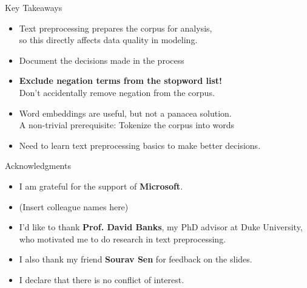\documentclass{beamer}
\renewcommand{\cite}{\citep}
\begin{document}




\begin{frame}{Key Takeaways}
\begin{itemize}
\item Text preprocessing prepares the corpus for analysis,\\
	so this directly affects data quality in modeling.
\item Document the decisions made in the process~\cite{nugent2020instead}
	\bigskip
\item \textbf{Exclude negation terms from the stopword list!}\\
	Don't accidentally remove negation from the corpus.
	\bigskip
\item Word embeddings are useful, but not a panacea solution.\\
	A non-trivial prerequisite: Tokenize the corpus into words\\
\item Need to learn text preprocessing basics to make better decisions.
\end{itemize}
\end{frame}

\begin{frame}{Acknowledgments}
\begin{itemize}
\item I am grateful for the support of \textbf{Microsoft}.
\item (Insert colleague names here)
	\bigskip
\item I'd like to thank \textbf{Prof. David Banks}, my PhD advisor at Duke University, who motivated me to do research in text preprocessing.
\item I also thank my friend \textbf{Sourav Sen} for feedback on the slides.
	\bigskip
\item I declare that there is no conflict of interest.
\end{itemize}
\end{frame}
\end{document}
